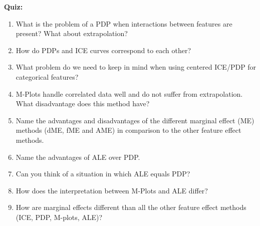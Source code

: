 \textbf{Quiz:}
\begin{enumerate}
        
    \item What is the problem of a PDP when interactions between features are present? What about extrapolation?
    \item How do PDPs and ICE curves correspond to each other?
    \item What problem do we need to keep in mind when using centered ICE/PDP for categorical features? 
    \item M-Plots handle correlated data well and do not suffer from extrapolation. What disadvantage does this method have?
    \item Name the advantages and disadvantages of the different marginal effect (ME) methods (dME, fME and AME) in comparison to the other feature effect methods.
    \item Name the advantages of ALE over PDP.
    \item Can you think of a situation in which ALE equals PDP?
    \item How does the interpretation between M-Plots and ALE differ?
    \item How are marginal effects different than all the other feature effect methods (ICE, PDP, M-plots, ALE)?



\end{enumerate}
